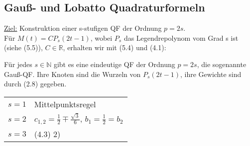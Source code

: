 \subsection{Gauß- und Lobatto Quadraturformeln}

\underline{Ziel:} Konstruktion einer s-stufigen QF der Ordnung $p=2s$.\\
Für $M(t) = CP_s(2t-1)$, wobei $P_s$ das Legendrepolynom vom Grad s ist (siehe (5.5)), $C \in \mathbb{R}$, erhalten wir mit (5.4) und (4.1):

\begin{theorem}
Für jedes $s \in \mathbb{N}$ gibt es eine eindeutige QF der Ordnung $p=2s$, die sogenannte Gauß-QF. Ihre Knoten sind die Wurzeln von $P_s(2t-1)$, ihre Gewichte sind durch (2.8) gegeben. 
\end{theorem}
\begin{example*}
\begin{tabular}{ll}
 
$s=1$ & Mittelpunktsregel \\

$s=2$ & $c_{1,2} = \frac{1}{2} \mp \frac{\sqrt{3}}{6}$, $b_1=\frac{1}{2} = b_2$ \\

$s=3$ & (4.3) 2) \\

\end{tabular}

\end{example*}

